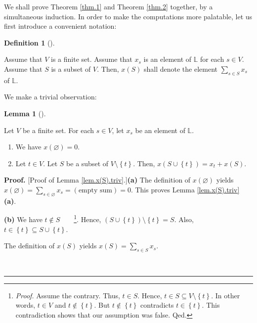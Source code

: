 \documentclass[numbers=enddot,12pt,final,onecolumn,notitlepage]{scrartcl}%
\theoremstyle{definition}
\newtheorem{lem}[theo]{Lemma}
\newenvironment{lemma}[1][]
{\begin{lem}[#1]\begin{leftbar}}
{\end{leftbar}\end{lem}}
\newtheorem{defi}[theo]{Definition}
\newenvironment{definition}[1][]
{\begin{defi}[#1]\begin{leftbar}}
{\end{leftbar}\end{defi}}
\newenvironment{proof}[1][Proof]{\noindent\textbf{#1.} }{\ \rule{0.5em}{0.5em}}
\let\sumnonlimits\sum
\renewcommand{\sum}{\sumnonlimits\limits}
\newenvironment{verlong}{}{}
\begin{document}
\begin{verlong}
We shall prove Theorem \ref{thm.1} and Theorem \ref{thm.2} together, by a
simultaneous induction. In order to make the computations more palatable, let
us first introduce a convenient notation:

\begin{definition}
\label{def.x(S)}Assume that $V$ is a finite set. Assume that $x_{s}$ is an
element of $\mathbb{L}$ for each $s\in V$. Assume that $S$ is a subset of $V$.
Then, $x\left(  S\right)  $ shall denote the element $\sum_{s\in S}x_{s}$ of
$\mathbb{L}$.
\end{definition}

We make a trivial observation:

\begin{lemma}
\label{lem.x(S).triv}Let $V$ be a finite set. For each $s\in V$, let $x_{s}$
be an element of $\mathbb{L}$.

\begin{enumerate}
\item[\textbf{(a)}] We have $x\left(  \varnothing\right)  =0$.

\item[\textbf{(b)}] Let $t\in V$. Let $S$ be a subset of $V\setminus\left\{
t\right\}  $. Then, $x\left(  S\cup\left\{  t\right\}  \right)  =x_{t}%
+x\left(  S\right)  $.
\end{enumerate}
\end{lemma}

\begin{proof}
[Proof of Lemma \ref{lem.x(S).triv}.]\textbf{(a)} The definition of $x\left(
\varnothing\right)  $ yields $x\left(  \varnothing\right)  =\sum
_{s\in\varnothing}x_{s}=\left(  \text{empty sum}\right)  =0$. This proves
Lemma \ref{lem.x(S).triv} \textbf{(a)}. \medskip

\textbf{(b)} We have $t\notin S$\ \ \ \ \footnote{\textit{Proof.} Assume the
contrary. Thus, $t\in S$. Hence, $t\in S\subseteq V\setminus\left\{
t\right\}  $. In other words, $t\in V$ and $t\notin\left\{  t\right\}  $. But
$t\notin\left\{  t\right\}  $ contradicts $t\in\left\{  t\right\}  $. This
contradiction shows that our assumption was false. Qed.}. Hence, $\left(
S\cup\left\{  t\right\}  \right)  \setminus\left\{  t\right\}  =S$. Also,
$t\in\left\{  t\right\}  \subseteq S\cup\left\{  t\right\}  $.

The definition of $x\left(  S\right)  $ yields $x\left(  S\right)  =\sum_{s\in
S}x_{s}$.


\end{proof}
\end{verlong}
\end{document}
